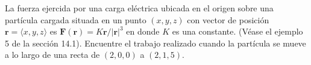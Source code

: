 \item La fuerza ejercida por una carga eléctrica ubicada en el origen sobre una partícula cargada situada en un punto $(x, y, z)$ con vector de posición $\mathbf{r} = \langle x, y, z \rangle$ es $\mathbf{F}(\mathbf{r}) = K \mathbf{r} / |\mathbf{r}|^3$ en donde $K$ es una constante. (Véase el ejemplo 5 de la sección 14.1). Encuentre el trabajo realizado cuando la partícula se mueve a lo largo de una recta de $(2, 0, 0)$ a $(2, 1, 5)$.
